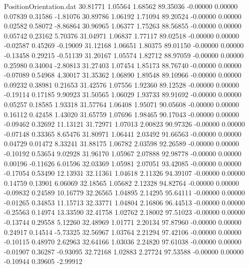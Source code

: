 \begin{filecontents}{PositionOrientation.dat}
  30.81771    1.05564    1.68562    89.35036   -0.00000    0.00000    0.07839    0.31586   -1.81076
  30.89786    1.06192    1.71094    89.20524   -0.00000    0.00000    0.02582    0.58072   -8.86864
  30.96965    1.06377    1.75263    88.56855   -0.00000    0.00000    0.05742    0.23162    5.70376
  31.04971    1.06837    1.77117    89.02518   -0.00000    0.00000   -0.02587    0.45269   -0.19009
  31.12168    1.06651    1.80375    89.01150   -0.00000    0.00000   -0.13458    0.29215   -0.51139
  31.20167    1.05574    1.82712    88.97059   -0.00000    0.00000    0.25980    0.34004   -2.80813
  31.27403    1.07454    1.85173    88.76740   -0.00000    0.00000   -0.07089    0.54968    4.30017
  31.35362    1.06890    1.89548    89.10966   -0.00000    0.00000    0.09232    0.38981    0.21653
  31.42576    1.07556    1.92360    89.12528   -0.00000    0.00000   -0.19114    0.17185    9.90923
  31.50565    1.06029    1.93733    89.91692   -0.00000    0.00000    0.05257    0.18585    1.93318
  31.57764    1.06408    1.95071    90.05608   -0.00000    0.00000    0.16112    0.42458    1.43020
  31.65759    1.07696    1.98465    90.17043   -0.00000    0.00000   -0.09462    0.32692   11.13121
  31.72971    1.07013    2.00823    90.97326   -0.00000    0.00000   -0.07148    0.33365    8.65476
  31.80971    1.06441    2.03492    91.66563   -0.00000    0.00000    0.04729    0.01472    8.33241
  31.88175    1.06782    2.03598    92.26589   -0.00000    0.00000   -0.10192    0.53654    9.02928
  31.96170    1.05967    2.07888    92.98778   -0.00000    0.00000    0.00196   -0.11626    6.01596
  32.03369    1.05981    2.07051    93.42085   -0.00000    0.00000   -0.17054    0.53490   12.13931
  32.11361    1.04618    2.11326    94.39107   -0.00000    0.00000    0.14759    0.13901    6.06069
  32.18565    1.05682    2.12328    94.82764   -0.00000    0.00000   -0.09832    0.24589   10.16779
  32.26565    1.04895    2.14295    95.64111   -0.00000    0.00000   -0.01265    0.34853   11.15713
  32.33771    1.04804    2.16806    96.44513   -0.00000    0.00000   -0.25563    0.14974   13.33590
  32.41758    1.02762    2.18002    97.51023   -0.00000    0.00000   -0.13744    0.29558    5.12260
  32.48969    1.01771    2.20134    97.87960   -0.00000    0.00000    0.24917    0.14514   -5.73325
  32.56967    1.03764    2.21294    97.42106   -0.00000    0.00000   -0.10115    0.48970    2.62963
  32.64166    1.03036    2.24820    97.61038   -0.00000    0.00000   -0.01907    0.36287   -0.93095
  32.72168    1.02883    2.27724    97.53588   -0.00000    0.00000   -0.10944    0.39605   -2.99912

\end{filecontents}

